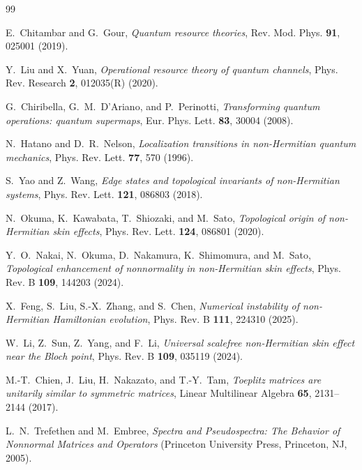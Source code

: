 \documentclass[reprint,amsmath,amssymb,aps,nofootinbib]{revtex4-2}
\begin{document}
\begin{thebibliography}{99}

E.~Chitambar and G.~Gour,
\textit{Quantum resource theories},
Rev. Mod. Phys. \textbf{91}, 025001 (2019).

Y.~Liu and X.~Yuan,
\textit{Operational resource theory of quantum channels},
Phys. Rev. Research \textbf{2}, 012035(R) (2020).

G.~Chiribella, G.~M.~D'Ariano, and P.~Perinotti,
\textit{Transforming quantum operations: quantum supermaps},
Eur. Phys. Lett. \textbf{83}, 30004 (2008).

N.~Hatano and D.~R.~Nelson,
\textit{Localization transitions in non-Hermitian quantum mechanics},
Phys. Rev. Lett. \textbf{77}, 570 (1996).

S.~Yao and Z.~Wang,
\textit{Edge states and topological invariants of non-Hermitian systems},
Phys. Rev. Lett. \textbf{121}, 086803 (2018).

N.~Okuma, K.~Kawabata, T.~Shiozaki, and M.~Sato,
\textit{Topological origin of non-Hermitian skin effects},
Phys. Rev. Lett. \textbf{124}, 086801 (2020).

Y.~O.~Nakai, N.~Okuma, D.~Nakamura, K.~Shimomura, and M.~Sato,
\textit{Topological enhancement of nonnormality in non-Hermitian skin effects},
Phys. Rev. B \textbf{109}, 144203 (2024).

X.~Feng, S.~Liu, S.-X.~Zhang, and S.~Chen,
\textit{Numerical instability of non-Hermitian Hamiltonian evolution},
Phys. Rev. B \textbf{111}, 224310 (2025).

W.~Li, Z.~Sun, Z.~Yang, and F.~Li,
\textit{Universal scalefree non-Hermitian skin effect near the Bloch point},
Phys. Rev. B \textbf{109}, 035119 (2024).

M.-T.~Chien, J.~Liu, H.~Nakazato, and T.-Y.~Tam,
\textit{Toeplitz matrices are unitarily similar to symmetric matrices},
Linear Multilinear Algebra \textbf{65}, 2131--2144 (2017).

L.~N.~Trefethen and M.~Embree,
\textit{Spectra and Pseudospectra: The Behavior of Nonnormal Matrices and
Operators} (Princeton University Press, Princeton, NJ, 2005).

\end{thebibliography}
\end{document}
